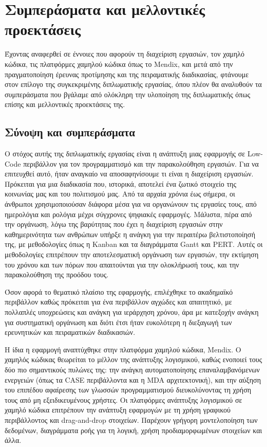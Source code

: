 \chapter{Συμπεράσματα και μελλοντικές προεκτάσεις}
    Έχοντας αναφερθεί σε έννοιες που αφορούν τη διαχείριση εργασιών, τον χαμηλό κώδικα, τις πλατφόρμες χαμηλού κώδικα όπως το Mendix, και μετά από την πραγματοποίηση έρευνας προτίμησης και της πειραματικής διαδικασίας, φτάνουμε στον επίλογο της συγκεκριμένης διπλωματικής εργασίας, όπου πλέον θα αναλυθούν τα συμπεράσματα που βγάλαμε από ολόκληρη την υλοποίηση της διπλωματικής όπως επίσης και μελλοντικές προεκτάσεις της.

    \section{Σύνοψη και συμπεράσματα}
        Ο στόχος αυτής της διπλωματικής εργασίας είναι η ανάπτυξη μιας εφαρμογής σε Low-Code περιβάλλον για τον προγραμματισμό και την παρακολούθηση εργασιών. Για να επιτευχθεί αυτό, ήταν αναγκαίο να αποσαφηνίσουμε τι είναι η διαχείριση εργασιών. Πρόκειται για μια διαδικασία που, ιστορικά, αποτελεί ένα ζωτικό στοιχείο της κοινωνίας μας και του πολιτισμού μας. Από τα αρχαία χρόνια έως σήμερα, οι άνθρωποι χρησιμοποιούσαν διάφορα μέσα για να οργανώνουν τις εργασίες τους, από ημερολόγια και ρολόγια μέχρι σύγχρονες ψηφιακές εφαρμογές. Μάλιστα, πέρα από την οργάνωση, λόγω της βαρύτητας που έχει η διαχείριση εργασιών στην καθημερινότητα των ανθρώπων υπήρξε η ανάγκη για την περαιτέρω βελτιστοποίησή της, με μεθοδολογίες όπως η Kanban και τα διαγράμματα Gantt και PERT. Αυτές οι μεθοδολογίες επιτρέπουν την αποτελεσματική οργάνωση των εργασιών, την εκτίμηση του χρόνου και των πόρων που απαιτούνται για την ολοκλήρωσή τους, και την παρακολούθηση της προόδου τους.

        Όσον αφορά το θεματικό πλαίσιο της εφαρμογής, επιλέχθηκε το ακαδημαϊκό περιβάλλον καθώς πρόκειται για ένα περιβάλλον αγχώδες και απαιτητικό, με πολλαπλές υποχρεώσεις και ανάγκη για ιεράρχηση χρόνου, άρα με κατεξοχήν ανάγκη για συστηματική οργάνωση και διότι έτσι ήταν ευκολότερη η διεξαγωγή των ερευνητικών και πειραματικών διαδικασιών.

        Η ίδια η εφαρμογή αναπτύχθηκε στην πλατφόρμα χαμηλού κώδικα, Mendix. Ο χαμηλός κώδικας θεωρείται το μέλλον της ανάπτυξης λογισμικού, καθώς ενοποιεί τους δύο πιο σημαντικούς πυλώνες της: την ανάγκη αυτοματοποίησης επαναλαμβανόμενων ενεργειών (όπως τα CASE περιβάλλοντα και η MDA αρχιτεκτονική), και την αύξηση του επιπέδου αφαίρεσης των γλωσσών προγραμματισμού διευκολύνοντας τη χρήση τους από μη εξειδικευμένους χρήστες. Οι πλατφόρμες ανάπτυξης λογισμικού σε χαμηλό κώδικα επιτρέπουν την ανάπτυξη εφαρμογών με τη χρήση γραφικού περιβάλλοντος και drag-and-drop στοιχείων. Παρέχουν γρήγορη μοντελοποίηση των δεδομένων, διαγράμματα ροής για τη λογική, χρήση προδιαμορφωμένων στοιχείων και άλλα.

